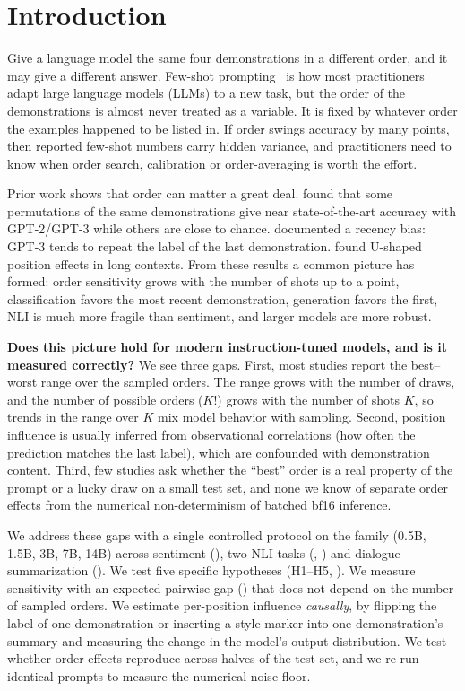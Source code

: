 \section{Introduction}
\label{sec:intro}

Give a language model the same four demonstrations in a different order, and it may give a different answer.
Few-shot prompting~\cite{brown2020language} is how most practitioners adapt large language models (LLMs) to a new task, but the order of the demonstrations is almost never treated as a variable.
It is fixed by whatever order the examples happened to be listed in.
If order swings accuracy by many points, then reported few-shot numbers carry hidden variance, and practitioners need to know when order search, calibration or order-averaging is worth the effort.

Prior work shows that order can matter a great deal.
\citet{lu2022fantastically} found that some permutations of the same demonstrations give near state-of-the-art accuracy with GPT-2/GPT-3 while others are close to chance.
\citet{zhao2021calibrate} documented a recency bias: GPT-3 tends to repeat the label of the last demonstration.
\citet{liu2024lost} found U-shaped position effects in long contexts.
From these results a common picture has formed: order sensitivity grows with the number of shots up to a point, classification favors the most recent demonstration, generation favors the first, NLI is much more fragile than sentiment, and larger models are more robust.

{\bf Does this picture hold for modern instruction-tuned models, and is it measured correctly?}
We see three gaps.
First, most studies report the best--worst range over the sampled orders. The range grows with the number of draws, and the number of possible orders ($K!$) grows with the number of shots $K$, so trends in the range over $K$ mix model behavior with sampling.
Second, position influence is usually inferred from observational correlations (\eg how often the prediction matches the last label), which are confounded with demonstration content.
Third, few studies ask whether the ``best'' order is a real property of the prompt or a lucky draw on a small test set, and none we know of separate order effects from the numerical non-determinism of batched bf16 inference.

We address these gaps with a single controlled protocol on the \qwen family (0.5B, 1.5B, 3B, 7B, 14B) across sentiment (\sst), two NLI tasks (\rte, \mnli) and dialogue summarization (\samsum).
We test five specific hypotheses (H1--H5, ).
We measure sensitivity with an expected pairwise gap (\pgap) that does not depend on the number of sampled orders.
We estimate per-position influence \emph{causally}, by flipping the label of one demonstration or inserting a style marker into one demonstration's summary and measuring the change in the model's output distribution.
We test whether order effects reproduce across halves of the test set, and we re-run identical prompts to measure the numerical noise floor.

